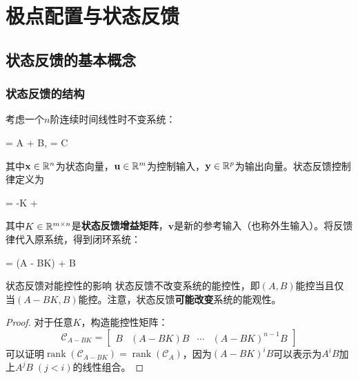 \chapter{极点配置与状态反馈}


\section{状态反馈的基本概念}

\subsection{状态反馈的结构}

考虑一个$n$阶连续时间线性时不变系统：
\begin{myformula}
 = A + B,\qquad {} = C
\end{myformula}
其中$\mathbf{x} \in \mathbb{R}^n$为状态向量，$\mathbf{u} \in \mathbb{R}^m$为控制输入，$\mathbf{y} \in \mathbb{R}^p$为输出向量。状态反馈控制律定义为
\begin{myformula}
 = -K + 
\end{myformula}
其中$K \in \mathbb{R}^{m \times n}$是\textbf{状态反馈增益矩阵}，$\mathbf{v}$是新的参考输入（也称外生输入）。将反馈律代入原系统，得到闭环系统：
\begin{myformula}
 = (A - BK) + B
\end{myformula}

\begin{myTheorem}{状态反馈对能控性的影响}
状态反馈不改变系统的能控性，即$(A,B)$能控当且仅当$(A-BK,B)$能控。注意，状态反馈\textbf{可能改变}系统的能观性。
\end{myTheorem}

\begin{proof}
对于任意$K$，构造能控性矩阵：
\[
\mathcal{C}_{A-BK} = \begin{bmatrix} B & (A-BK)B & \cdots & (A-BK)^{n-1}B \end{bmatrix}
\]
可以证明$\operatorname{rank}(\mathcal{C}_{A-BK}) = \operatorname{rank}(\mathcal{C}_A)$，因为$(A-BK)^iB$可以表示为$A^iB$加上$A^jB\;(j<i)$的线性组合。
\end{proof}

